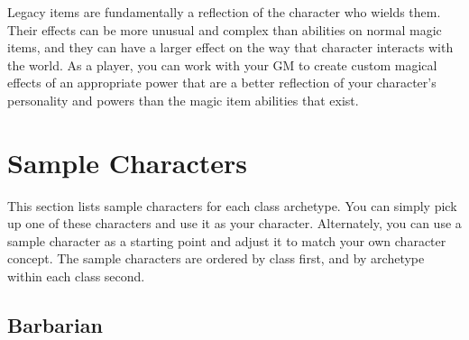             Legacy items are fundamentally a reflection of the character who wields them.
            Their effects can be more unusual and complex than abilities on normal magic items, and they can have a larger effect on the way that character interacts with the world.
            As a player, you can work with your GM to create custom magical effects of an appropriate power that are a better reflection of your character's personality and powers than the magic item abilities that exist.

\section{Sample Characters}

    This section lists sample characters for each class archetype.
    You can simply pick up one of these characters and use it as your character.
    Alternately, you can use a sample character as a starting point and adjust it to match your own character concept.
    The sample characters are ordered by class first, and by archetype within each class second.

    \subsection{Barbarian}

